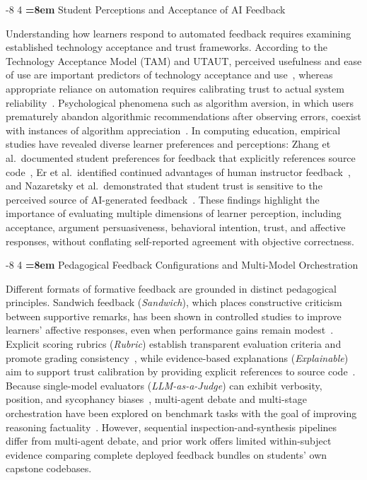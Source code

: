 \documentclass{llncs}
\makeatletter
\renewcommand\subsection{\@startsection{subsection}{2}{\z@}%
                       {-8\p@ \@plus -2\p@ \@minus -2\p@}%
                       {4\p@ \@plus 1\p@ \@minus 1\p@}%
                       {\normalfont\normalsize\bfseries\boldmath
                        \rightskip=\z@ \@plus 8em\pretolerance=10000 }}
\makeatother
\begin{document}
\subsection{Student Perceptions and Acceptance of AI Feedback}

Understanding how learners respond to automated feedback requires examining established technology acceptance and trust frameworks. According to the Technology Acceptance Model (TAM) and UTAUT, perceived usefulness and ease of use are important predictors of technology acceptance and use~\cite{davis1989perceived,venkatesh2003user}, whereas appropriate reliance on automation requires calibrating trust to actual system reliability~\cite{lee2004trust}. Psychological phenomena such as algorithm aversion, in which users prematurely abandon algorithmic recommendations after observing errors, coexist with instances of algorithm appreciation~\cite{dietvorst2015algorithm,logg2019algorithm}. In computing education, empirical studies have revealed diverse learner preferences and perceptions: Zhang et al.\ documented student preferences for feedback that explicitly references source code~\cite{zhang2024students}, Er et al.\ identified continued advantages of human instructor feedback~\cite{er2025assessing}, and Nazaretsky et al.\ demonstrated that student trust is sensitive to the perceived source of AI-generated feedback~\cite{nazaretsky2024ai}. These findings highlight the importance of evaluating multiple dimensions of learner perception, including acceptance, argument persuasiveness, behavioral intention, trust, and affective responses, without conflating self-reported agreement with objective correctness.

\subsection{Pedagogical Feedback Configurations and Multi-Model Orchestration}

Different formats of formative feedback are grounded in distinct pedagogical principles. Sandwich feedback (\textit{Sandwich}), which places constructive criticism between supportive remarks, has been shown in controlled studies to improve learners' affective responses, even when performance gains remain modest~\cite{parkes2013feedback}. Explicit scoring rubrics (\textit{Rubric}) establish transparent evaluation criteria and promote grading consistency~\cite{jonsson2007use}, while evidence-based explanations (\textit{Explainable}) aim to support trust calibration by providing explicit references to source code~\cite{khosravi2022explainable}. Because single-model evaluators (\textit{LLM-as-a-Judge}) can exhibit verbosity, position, and sycophancy biases~\cite{zheng2023judging}, multi-agent debate and multi-stage orchestration have been explored on benchmark tasks with the goal of improving reasoning factuality~\cite{du2024improving,zheng2023judging}. However, sequential inspection-and-synthesis pipelines differ from multi-agent debate, and prior work offers limited within-subject evidence comparing complete deployed feedback bundles on students' own capstone codebases.
\end{document}
